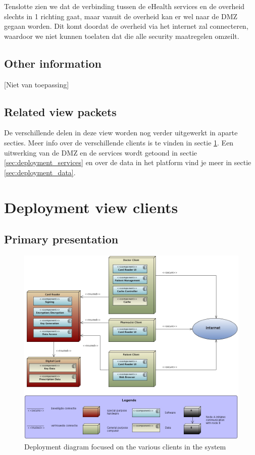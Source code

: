 \documentclass[a4paper,10pt]{article}
\begin{document}
Tenslotte zien we dat de verbinding tussen de eHealth services en de overheid slechts in 1 richting gaat, maar vanuit de overheid kan er wel naar de DMZ gegaan worden. Dit komt doordat de overheid via het internet zal connecteren, waardoor we niet kunnen toelaten dat die alle security maatregelen omzeilt.

\subsection{Other information}
[Niet van toepassing]

\subsection{Related view packets}

De verschillende delen in deze view worden nog verder uitgewerkt in aparte secties. Meer info over de verschillende clients is te vinden in sectie \ref{sec:deployment_clients}. Een uitwerking van de DMZ en de services wordt getoond in sectie \ref{sec:deployment_services} en over de data in het platform vind je meer in sectie \ref{sec:deployment_data}.

\section{Deployment view clients}
\label{sec:deployment_clients}

\subsection{Primary presentation}
\begin{center}
    \begin{figure}[!h]
      \includegraphics[width=\textwidth]{../images/deployment_clients.jpg}
	\caption{Deployment diagram focused on the various clients in the system}
    \end{figure}
  \end{center}
\end{document}
